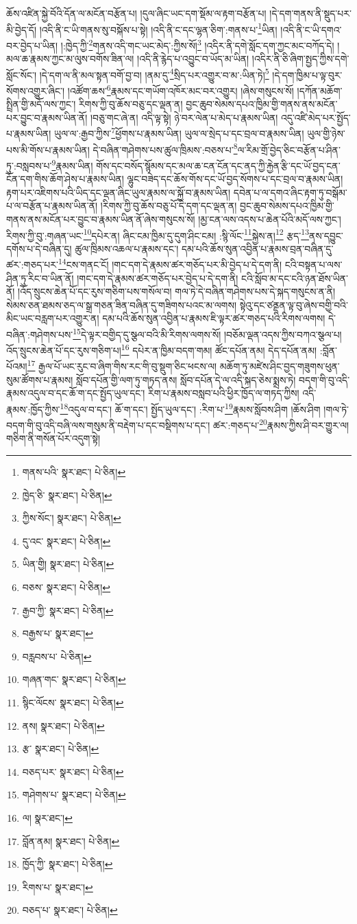 ཆོས་འཛིན་སྐྱེ་བོའི་དོན་ལ་མངོན་བརྩོན་པ། །དུལ་ཞིང་ཡང་དག་སྡོམ་ལ་རྟག་བརྩོན་པ། །དེ་དག་གནས་ནི་སྡུད་པར་མི་བྱེད་དོ། །འདི་ནི་ང་ཡི་གནས་སུ་བསྐོས་པ་སྟེ། །འདི་ནི་ང་དང་ལྷན་ཅིག་:གནས་པ་\footnote{གནས་པའི་  སྣར་ཐང་།  པེ་ཅིན། }ཡིན། །འདི་ནི་ང་ཡི་དགའ་བར་བྱེད་པ་ཡིན། །:ཁྱེད་ཀྱི་\footnote{ཁྱེད་ཅི་  སྣར་ཐང་།  པེ་ཅིན། }གནས་འདི་གང་ཡང་མེད་:ཀྱིས་སོ།\footnote{ཀྱིས་སོང་།  སྣར་ཐང་།  པེ་ཅིན། } །འདིར་ནི་དགེ་སློང་དག་ཀྱང་མང་བཀོད་དེ། །མལ་ཆ་རྣམས་ཀྱང་མ་ལུས་བགོས་ཟིན་ལ། །འདི་ནི་རྙེད་པ་འབྱུང་བ་ཡོད་མ་ཡིན། །འདིར་ནི་ཅི་ཞིག་སྤྱད་ཀྱིས་དགེ་སློང་སོང་། །དེ་དག་ལ་ནི་མལ་སྟན་བགོ་བྱ་བ། །ནམ་དུ་\footnote{དུ་འང་  སྣར་ཐང་།  པེ་ཅིན། }སྲིད་པར་འགྱུར་བ་མ་:ཡིན་ཏེ།\footnote{ཡིན་གྱི།  སྣར་ཐང་།  པེ་ཅིན། } །དེ་དག་ཁྱིམ་པ་ལྟ་བུར་སོགས་འགྱུར་ཞིང་། །འཚོག་ཆས་\footnote{བཅས་  སྣར་ཐང་།  པེ་ཅིན། }རྣམས་དང་གཡོག་འཁོར་མང་བར་འགྱུར། །ཞེས་གསུངས་སོ། །དཀོན་མཆོག་སྤྲིན་གྱི་མདོ་ལས་ཀྱང་། རིགས་ཀྱི་བུ་ཆོས་བཅུ་དང་ལྡན་ན། བྱང་ཆུབ་སེམས་དཔའ་ཁྱིམ་གྱི་གནས་ནས་མངོན་པར་བྱུང་བ་རྣམས་ཡིན་ནོ། །བཅུ་གང་ཞེ་ན། འདི་ལྟ་སྟེ། ཉེ་བར་ལེན་པ་མེད་པ་རྣམས་ཡིན། འདུ་འཛི་མེད་པར་སྤྱོད་པ་རྣམས་ཡིན། ཡུལ་ལ་:རྒྱབ་ཀྱིས་\footnote{རྒྱབ་ཀྱི་  སྣར་ཐང་།  པེ་ཅིན། }ཕྱོགས་པ་རྣམས་ཡིན། ཡུལ་ལ་སྲེད་པ་དང་བྲལ་བ་རྣམས་ཡིན། ཡུལ་གྱི་ཉེས་པས་མི་གོས་པ་རྣམས་ཡིན། དེ་བཞིན་གཤེགས་པས་ཚུལ་ཁྲིམས་:བཅས་པ་\footnote{བརྒྱས་པ་  སྣར་ཐང་། }ལ་རིམ་གྲོ་བྱེད་ཅིང་བརྩོན་པ་ཤིན་ཏུ་:བསླབས་པ་\footnote{བརླབས་པ་  པེ་ཅིན། }རྣམས་ཡིན། གོས་དང་བསོད་སྙོམས་དང་མལ་ཆ་ངན་ངོན་དང་ནད་ཀྱི་རྐྱེན་རྩི་དང་ཡོ་བྱད་ངན་ངོན་དག་གིས་ཆོག་ཤེས་པ་རྣམས་ཡིན། ལྷུང་བཟེད་དང་ཆོས་གོས་དང་ཡོ་བྱད་སོགས་པ་དང་བྲལ་བ་རྣམས་ཡིན། རྟག་པར་འཇིགས་པའི་ཡིད་དང་ལྡན་ཞིང་ཡུལ་རྣམས་ལ་སྐྱོ་བ་རྣམས་ཡིན། དབེན་པ་ལ་དགའ་ཞིང་རྟག་ཏུ་བསྒོམ་པ་ལ་བརྩོན་པ་རྣམས་ཡིན་ནོ། །རིགས་ཀྱི་བུ་ཆོས་བཅུ་པོ་དེ་དག་དང་ལྡན་ན། བྱང་ཆུབ་སེམས་དཔའ་ཁྱིམ་གྱི་གནས་ནས་མངོན་པར་བྱུང་བ་རྣམས་ཡིན་ནོ་ཞེས་གསུངས་སོ། །མྱ་ངན་ལས་འདས་པ་ཆེན་པོའི་མདོ་ལས་ཀྱང་། རིགས་ཀྱི་བུ་:གཞན་ཡང་\footnote{གཞན་གང་  སྣར་ཐང་།  པེ་ཅིན། }དཔེར་ན། ཞིང་ངམ་ཁྱིམ་དུ་དུག་ཤིང་ངམ། :སྙི་ལོང་\footnote{སྙིང་ལོངས་  སྣར་ཐང་།  པེ་ཅིན། }སྐྱེས་ན།\footnote{ནས།  སྣར་ཐང་།  པེ་ཅིན། } རྩད་\footnote{རྩ་  སྣར་ཐང་།  པེ་ཅིན། }ནས་དབྱུང་དགོས་པ་དེ་བཞིན་དུ། ཚུལ་ཁྲིམས་འཆལ་པ་རྣམས་དང་། དམ་པའི་ཆོས་སུན་འབྱིན་པ་རྣམས་བྲན་བཞིན་དུ་ཚར་:གཅད་པར་\footnote{བཅད་པར་  སྣར་ཐང་།  པེ་ཅིན། }ངས་གནང་ངོ། །གང་དག་དེ་རྣམས་ཚར་གཅོད་པར་མི་བྱེད་པ་དེ་དག་ནི། ངའི་བསྟན་པ་ལས་ཤིན་ཏུ་རིང་བ་ཡིན་ནོ། །གང་དག་དེ་རྣམས་ཚར་གཅོད་པར་བྱེད་པ་དེ་དག་ནི། ངའི་སློབ་མ་དང་ངའི་ཉན་ཐོས་ཡིན་ནོ། །འོད་སྲུངས་ཆེན་པོ་དང་རུས་གཅིག་པས་གསོལ་བ། གལ་ཏེ་དེ་བཞིན་གཤེགས་པས་དེ་སྐད་གསུངས་ན་ནི། སེམས་ཅན་ཐམས་ཅད་ལ་སྒྲ་གཅན་ཟིན་བཞིན་དུ་གཟིགས་པའང་མ་ལགས། སྟེའུ་དང་ཙནྡན་ལྟ་བུ་ཞེས་བགྱི་བའི་མིང་ཡང་བརླག་པར་འགྱུར་ན། དམ་པའི་ཆོས་སུན་འབྱིན་པ་རྣམས་ཇི་ལྟར་ཚར་གཅད་པའི་རིགས་ལགས། དེ་བཞིན་:གཤེགས་པས་\footnote{གཤེགས་པ་  སྣར་ཐང་།  པེ་ཅིན། }དེ་ལྟར་བགྱིད་དུ་སྩལ་བའི་མི་རིགས་ལགས་སོ། །བཅོམ་ལྡན་འདས་ཀྱིས་བཀའ་སྩལ་པ། འོད་སྲུངས་ཆེན་པོ་དང་རུས་གཅིག་པ།\footnote{ལ།  སྣར་ཐང་། } དཔེར་ན་ཁྱིམ་བདག་གམ། ཚོང་དཔོན་ནམ། དེད་དཔོན་ནམ། :བློན་པོའམ།\footnote{བློན་ནམ།  སྣར་ཐང་།  པེ་ཅིན། } རྒྱལ་པོ་ཡང་རུང་བ་ཞིག་གིས་རང་གི་བུ་སྡུག་ཅིང་ཕངས་ལ། མཆོག་ཏུ་མཛེས་ཤིང་བྱད་གཟུགས་ཕུན་སུམ་ཚོགས་པ་རྣམས། སློབ་དཔོན་གྱི་ལག་ཏུ་གཏད་ནས། སློབ་དཔོན་དེ་ལ་འདི་སྐད་ཅེས་སྨྲས་ཏེ། བདག་གི་བུ་འདི་རྣམས་འདུལ་བ་དང་ཆོ་ག་དང་སྤྱོད་ཡུལ་དང་། རིག་པ་རྣམས་བསླབ་པའི་ཕྱིར་ཁྱོད་ལ་གཏད་ཀྱིས། འདི་རྣམས་:ཁྱོད་ཀྱིས་\footnote{ཁྱོད་ཀྱི་  སྣར་ཐང་།  པེ་ཅིན། }འདུལ་བ་དང་། ཆོ་ག་དང་། སྤྱོད་ཡུལ་དང་། :རིག་པ་\footnote{རིགས་པ་  སྣར་ཐང་། }རྣམས་སློབས་ཤིག །ཆོས་ཤིག །གལ་ཏེ་བདག་གི་བུ་འདི་བཞི་ལས་གསུམ་ནི་བརྡེག་པ་དང་བསྡིགས་པ་དང་། ཚར་:གཅད་པ་\footnote{བཅད་པ་  སྣར་ཐང་།  པེ་ཅིན། }རྣམས་ཀྱིས་ཤི་བར་གྱུར་ལ། གཅིག་ནི་གསོན་པོར་འདུག་སྟེ། 